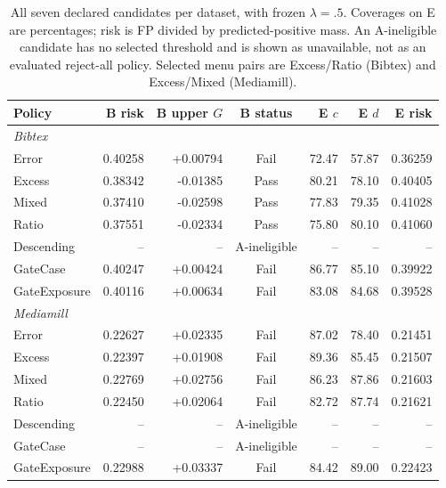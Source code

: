 \begin{table}[H]\centering\small
\setlength{\tabcolsep}{4pt}
\caption{All seven declared candidates per dataset, with frozen $\lambda=.5$. Coverages on E are percentages; risk is FP divided by predicted-positive mass. An A-ineligible candidate has no selected threshold and is shown as unavailable, not as an evaluated reject-all policy. Selected menu pairs are Excess/Ratio (Bibtex) and Excess/Mixed (Mediamill).}
\label{tab:v13-candidates}
\begin{tabular}{lrrcrrr}\toprule
Policy & B risk & B upper $G$ & B status & E $c$ & E $d$ & E risk\\\midrule
\multicolumn{7}{l}{\textit{Bibtex}}\\
Error & 0.40258 & +0.00794 & Fail & 72.47 & 57.87 & 0.36259 \\
Excess & 0.38342 & -0.01385 & Pass & 80.21 & 78.10 & 0.40405 \\
Mixed & 0.37410 & -0.02598 & Pass & 77.83 & 79.35 & 0.41028 \\
Ratio & 0.37551 & -0.02334 & Pass & 75.80 & 80.10 & 0.41060 \\
Descending & -- & -- & A-ineligible & -- & -- & -- \\
GateCase & 0.40247 & +0.00424 & Fail & 86.77 & 85.10 & 0.39922 \\
GateExposure & 0.40116 & +0.00634 & Fail & 83.08 & 84.68 & 0.39528 \\
\midrule
\multicolumn{7}{l}{\textit{Mediamill}}\\
Error & 0.22627 & +0.02335 & Fail & 87.02 & 78.40 & 0.21451 \\
Excess & 0.22397 & +0.01908 & Fail & 89.36 & 85.45 & 0.21507 \\
Mixed & 0.22769 & +0.02756 & Fail & 86.23 & 87.86 & 0.21603 \\
Ratio & 0.22450 & +0.02064 & Fail & 82.72 & 87.74 & 0.21621 \\
Descending & -- & -- & A-ineligible & -- & -- & -- \\
GateCase & -- & -- & A-ineligible & -- & -- & -- \\
GateExposure & 0.22988 & +0.03337 & Fail & 84.42 & 89.00 & 0.22423 \\
\bottomrule\end{tabular}
\end{table}

